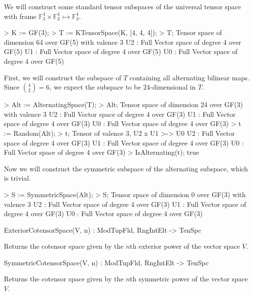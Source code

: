 \begin{example}[StandardTenSubspcs]

We will construct some standard tensor subspaces of the universal tensor space
with frame $\mathbb{F}_3^4\times \mathbb{F}_3^4\rightarrowtail\mathbb{F}_3^4$.
\begin{code}
> K := GF(3);
> T := KTensorSpace(K, [4, 4, 4]);
> T;
Tensor space of dimension 64 over GF(5) with valence 3
U2 : Full Vector space of degree 4 over GF(5)
U1 : Full Vector space of degree 4 over GF(5)
U0 : Full Vector space of degree 4 over GF(5)
\end{code}

First, we will construct the subspace of $T$ containing all alternating bilinear maps.
Since $\binom{4}{2}=6$, we expect the subspace to be 24-dimensional in $T$. 
\begin{code}
> Alt := AlternatingSpace(T);
> Alt;
Tensor space of dimension 24 over GF(3) with valence 3
U2 : Full Vector space of degree 4 over GF(3)
U1 : Full Vector space of degree 4 over GF(3)
U0 : Full Vector space of degree 4 over GF(3)
> t := Random(Alt);
> t;
Tensor of valence 3, U2 x U1 >-> U0
U2 : Full Vector space of degree 4 over GF(3)
U1 : Full Vector space of degree 4 over GF(3)
U0 : Full Vector space of degree 4 over GF(3)
> IsAlternating(t);
true
\end{code}

Now we will construct the symmetric subspace of the alternating subspace, which is trivial.
\begin{code}
> S := SymmetricSpace(Alt);
> S;
Tensor space of dimension 0 over GF(3) with valence 3
U2 : Full Vector space of degree 4 over GF(3)
U1 : Full Vector space of degree 4 over GF(3)
U0 : Full Vector space of degree 4 over GF(3)
\end{code}
\end{example}

\begin{intrinsics}
ExteriorCotensorSpace(V, n) : ModTupFld, RngIntElt -> TenSpc
\end{intrinsics}

Returns the cotensor space given by the $n$th exterior power of the vector space $V$.

\begin{intrinsics}
SymmetricCotensorSpace(V, n) : ModTupFld, RngIntElt -> TenSpc
\end{intrinsics}

Returns the cotensor space given by the $n$th symmetric power of the vector space $V$.

